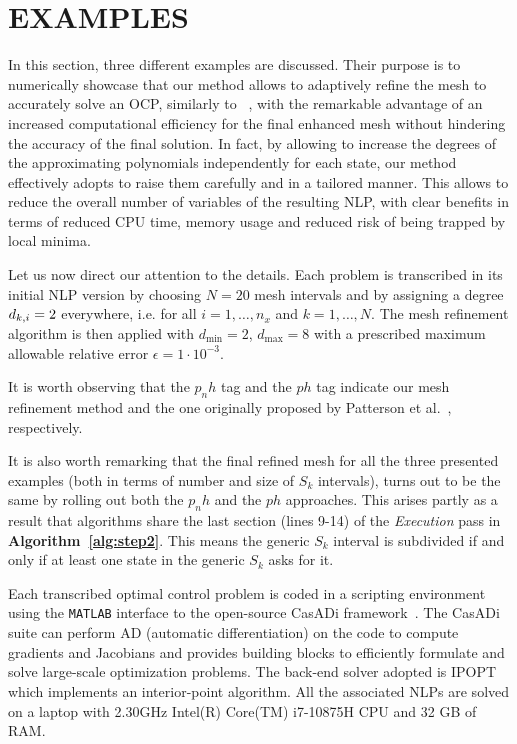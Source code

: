 \section*{EXAMPLES}
In this section, three different examples are discussed. Their purpose is to numerically showcase that our method allows to adaptively refine the mesh to accurately solve an OCP, similarly to ~\cite{Patterson:OCAM:2015}, with the remarkable advantage of an increased computational efficiency for the final enhanced mesh without hindering the accuracy of the final solution. 
In fact, by allowing to increase the degrees of the approximating polynomials independently for each state, our method effectively adopts to raise them carefully and in a tailored manner. This allows to reduce the overall number of variables of the resulting NLP, with clear benefits in terms of reduced CPU time, memory usage and reduced risk of being trapped by local minima.

Let us now direct our attention to the details. Each problem is transcribed in its initial NLP version by choosing $N = 20$ mesh intervals and by assigning a degree $d_{k,i} = 2$ everywhere, i.e. for all $i = 1, \dots, n_x$ and  $k = 1, \dots, N$. The mesh refinement algorithm is then applied with $d_{\min} = 2$, $d_{\max} = 8$ with a prescribed maximum allowable relative error $\epsilon = 1 \cdot 10^{-3}$.

It is worth observing that the $p_{n}h$ tag and the $ph$ tag indicate our mesh refinement method and the one originally proposed by Patterson et al.~\cite{Patterson:OCAM:2015}, respectively.

It is also worth remarking that the final refined mesh for all the three presented examples (both in terms of number and size of $S_{k}$ intervals), turns out to be the same by rolling out both the $p_{n}h$ and the $ph$ approaches. This arises partly as a result that algorithms share the last section (lines 9-14) of the \emph{Execution} pass in {\bf Algorithm~\ref{alg:step2}}. This means the generic $S_k$ interval is subdivided if and only if at least one state in the generic $S_k$ asks for it.

Each transcribed optimal control problem is coded in a scripting environment using the \texttt{MATLAB} interface to the open-source CasADi framework~\cite{casadi:MPC:2019}. 
The CasADi suite can perform AD (automatic differentiation) on the code to compute gradients and Jacobians and provides building blocks to efficiently formulate and solve large-scale optimization problems. The back-end solver adopted is IPOPT~\cite{Biegler:CCE:2009} which implements an interior-point algorithm. All the associated NLPs are solved on a laptop with 2.30GHz Intel(R) Core(TM) i7-10875H CPU and 32 GB of RAM.



